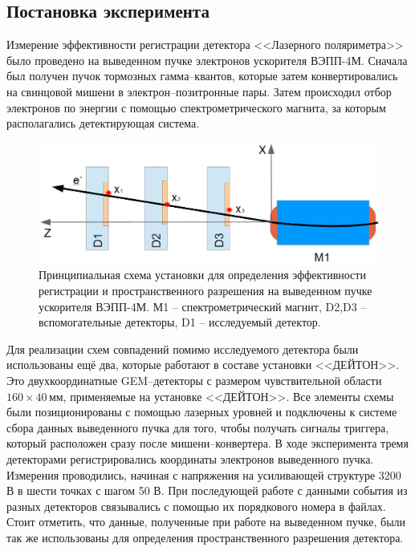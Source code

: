 \subsection{Постановка эксперимента}
Измерение эффективности регистрации детектора <<Лазерного поляриметра>> было проведено на выведенном пучке электронов ускорителя ВЭПП-4М. Сначала был получен пучок тормозных гамма--квантов, которые затем конвертировались на свинцовой мишени в электрон--позитронные пары. Затем происходил отбор электронов по энергии с помощью спектрометрического магнита, за которым располагались детектирующая система.
 \begin{figure}[h]
 	\centering
 	\includegraphics[width= 12cm]{img/reg_eff_exp_scheme.png}
 	\caption{Принципиальная схема установки для определения эффективности регистрации и пространственного разрешения на выведенном пучке ускорителя ВЭПП-4М. М1 -- спектрометрический магнит, D2,D3 -- вспомогательные детекторы, D1 -- исследуемый детектор.}
 	\label{fig:test_beam_scheme}
 \end{figure}
Для реализации схем совпадений помимо исследуемого детектора были использованы ещё два, которые работают в составе установки <<ДЕЙТОН>>. Это двухкоординатные GEM--детекторы с размером чувствительной области $160 \times 40$\,мм, применяемые на установке <<ДЕЙТОН>>. Все элементы схемы были позиционированы с помощью лазерных уровней и подключены к системе сбора данных выведенного пучка для того, чтобы получать сигналы триггера, который расположен сразу после мишени--конвертера. В ходе эксперимента тремя детекторами регистрировались координаты электронов выведенного пучка. Измерения проводились, начиная с напряжения на усиливающей структуре 3200 В в шести точках с шагом 50 В. При последующей работе с данными события из разных детекторов связывались с помощью их порядкового номера в файлах. Стоит отметить, что данные, полученные при работе на выведенном пучке, были так же использованы для определения пространственного разрешения детектора. 

